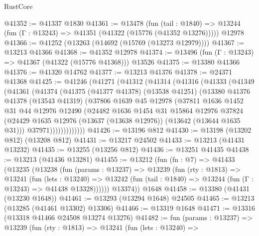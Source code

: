 \begin{lexlean}{RustCore}
\begin{coremodule}
@41352 := @41337 @1830
@41361 := @13478
    (fun (tail : @1840) => @13244 (fun (Γ : @13243) => @41351 (@41322 (@15776 (@41352 @13276)))))
    @12978
@41366 := @41252 (@13263 (@14692 (@15769 (@13273 @12979))))
@41367 := @13213 @41366
@41368 := @41352 @12978
@41374 := @13496 (fun (Γ : @13243) => @41367 (@41322 (@15776 @41368))) @13526
@41375 := @13380 @41366
@41376 := @41320 @14762
@41377 := @13213 @41376
@41378 := @24371 @41368
@41425 := @41246
    (@41271
      (@41312
        (@41314
          (@41316
            (@41333
              (@41349
                (@41361
                  (@41374
                    (@41375
                      (@41377 @41378)
                      (@13538 @41251)
                      (@13380
                        @41376
                        @41378
                        (@13543 @41319)
                        (@37806
                          @1639
                          @45
                          @12978
                          (@37811
                            @1636
                            @1452
                            @31
                            @44
                            @12976
                            @12490
                            (@24482
                              @1636
                              @1454
                              @31
                              @15864
                              @12976
                              @37824
                              (@24429
                                @1635
                                @12976
                                (@13637 (@13638 @12976))
                                (@13642 (@13644 @1635 @31)))
                              @37971)))))))))))))
@41426 := @13196 @812
@41430 := @13198 (@13202 @812) (@13208 @812)
@41431 := @13217 @24502
@41433 := @13213 (@41431 @13232)
@41435 := @13255 (@13256 @812)
@41436 := @13251 @41435
@41438 := @13213 (@41436 @13281)
@41455 := @13212
    (fun (fn : @7) =>
    @41433
      (@13235
        (@13238
          (fun (params : @13237) =>
          @13239
            (fun (rty : @1813) =>
            @13241
              (fun (lets : @13240) =>
              @13242 (fun (tail : @1840) => @13244 (fun (Γ : @13243) => @41438 @13328))))))
        @13374))
    @1648
@41458 := @13380 (@41431 (@13230 @1648))
@41461 := @13293 (@13294 @1648) @24505
@41465 := @13213 (@13285 (@41461 @13302) @13306)
@41466 := @13319 @1648
@41471 := @13316 (@13318 @41466 @24508 @13274 @13276)
@41482 := fun (params : @13237) =>
  @13239
    (fun (rty : @1813) =>
    @13241
      (fun (lets : @13240) =>

\end{coremodule}
\end{lexlean}
